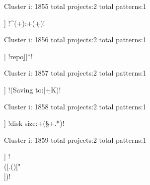 Cluster i: 1855
total projects:2
total patterns:1
\begin{multicols}{1}
\begin{description}[noitemsep,topsep=0pt]
\item [[2] ] \cverb!^(\w+)\s*:\s+(\d+)!
\end{description}
\end{multicols}







Cluster i: 1856
total projects:2
total patterns:1
\begin{multicols}{1}
\begin{description}[noitemsep,topsep=0pt]
\item [[2] ] \cverb!repo\=[\:\w\d\/]*!
\end{description}
\end{multicols}







Cluster i: 1857
total projects:2
total patterns:1
\begin{multicols}{1}
\begin{description}[noitemsep,topsep=0pt]
\item [[2] ] \cverb!(Saving to:|\s*\d+K)!
\end{description}
\end{multicols}







Cluster i: 1858
total projects:2
total patterns:1
\begin{multicols}{1}
\begin{description}[noitemsep,topsep=0pt]
\item [[2] ] \cverb!disk size:\s+(\S+.*)!
\end{description}
\end{multicols}







Cluster i: 1859
total projects:2
total patterns:1
\begin{multicols}{1}
\begin{description}[noitemsep,topsep=0pt]
\item [[2] ] \cverb!\\([.(){}[\]"\\])!
\end{description}
\end{multicols}








